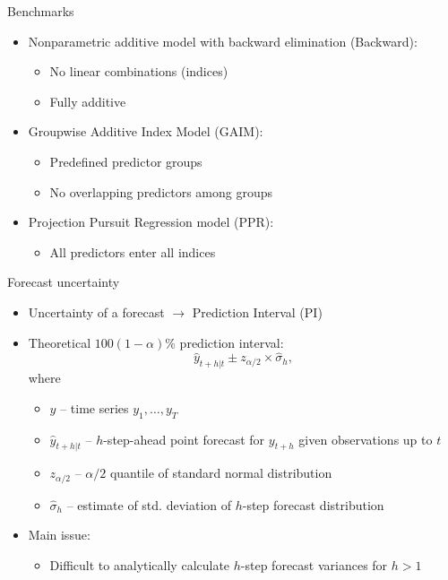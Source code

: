 \documentclass[
  12pt,
  ignorenonframetext,
  aspectratio=169,
]{beamer}
\begin{document}
\begin{frame}{Benchmarks}
\label{benchmarks}
\begin{itemize}
  \item \color{violet} Nonparametric additive model with backward elimination (Backward):
  \begin{itemize}
    \item No linear combinations (indices)
    \item Fully additive \newline
  \end{itemize}
  \pause
  \item \color{violet} Groupwise Additive Index Model (GAIM):
  \begin{itemize}
    \item Predefined predictor groups
    \item No overlapping predictors among groups \newline
  \end{itemize}
  \pause
  \item \color{violet} Projection Pursuit Regression model (PPR):
  \begin{itemize}
    \item All predictors enter all indices
  \end{itemize}
\end{itemize}
\end{frame}

\begin{frame}{Forecast uncertainty}
\label{forecast-uncertainty}
\begin{itemize}
  \item Uncertainty of a forecast \alert{${\rightarrow}$ Prediction Interval (PI)}
  \pause
  \item Theoretical $100(1 - \alpha)\%$ prediction interval:
$$
  \hat{y}_{t+h|t} \pm z_{\alpha/2} \times \hat{\sigma}_{h},
$$
where
  \begin{itemize}
    \item \small \color{black} $y$ -- \color{violet} time series $y_{1}, \dots, y_{T}$
    \item \small \color{black} $\hat{y}_{t+h|t}$ -- \color{violet} $h$-step-ahead point forecast for $y_{t+h}$ given observations up to $t$
    \item \small \color{black} $z_{\alpha/2}$ -- \color{violet} $\alpha/2$ quantile of standard normal distribution
    \item \small \color{black} $\hat{\sigma}_{h}$ -- \color{violet} estimate of std. deviation of $h$-step forecast distribution
  \end{itemize}
  \pause
  \item Main issue:
  \begin{itemize}
    \item \small \color{blue} Difficult to analytically calculate $h$-step forecast variances for $h > 1$
  \end{itemize}
\end{itemize}
\end{frame}
\end{document}
